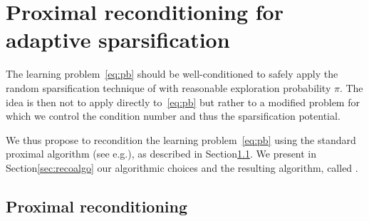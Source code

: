 \section{Proximal reconditioning for adaptive sparsification}\label{sec:spy_recon}


The learning problem~\eqref{eq:pb} should be well-conditioned to safely apply the random sparsification technique of \salgo with reasonable exploration probability $\pi$. The idea is then not to apply \salgo directly to~\eqref{eq:pb} but rather to a modified problem for which we control the condition number and thus the sparsification potential. 

We thus propose to recondition the learning problem~\eqref{eq:pb} using the standard proximal algorithm (see e.g.\;\cite{rockafellar1976monotone}), as described in Section\;\ref{sec:proxrecon}. We present in Section\;\ref{sec:recoalgo} our algorithmic choices and the resulting algorithm, called \recoalgo.


\subsection{Proximal reconditioning}\label{sec:proxrecon}


